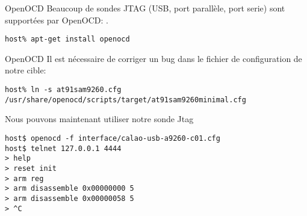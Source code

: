 \begin{frame}[fragile=singleslide]{OpenOCD}
  Beaucoup  de sondes  JTAG  (USB, port  parallèle,  port serie)  sont
  supportées                        par                       OpenOCD:
  .


  \begin{lstlisting}
host% apt-get install openocd
  \end{lstlisting}
\end{frame}


\begin{frame}[fragile=singleslide]{OpenOCD}
  Il  est   nécessaire  de  corriger   un  bug  dans  le   fichier  de
  configuration de notre cible:
  \begin{lstlisting}
host% ln -s at91sam9260.cfg /usr/share/openocd/scripts/target/at91sam9260minimal.cfg 
  \end{lstlisting} 
  Nous pouvons maintenant utiliser notre sonde Jtag
  \begin{lstlisting}
host$ openocd -f interface/calao-usb-a9260-c01.cfg
host$ telnet 127.0.0.1 4444
> help
> reset init
> arm reg
> arm disassemble 0x00000000 5
> arm disassemble 0x00000058 5
> ^C
  \end{lstlisting}
\end{frame}


